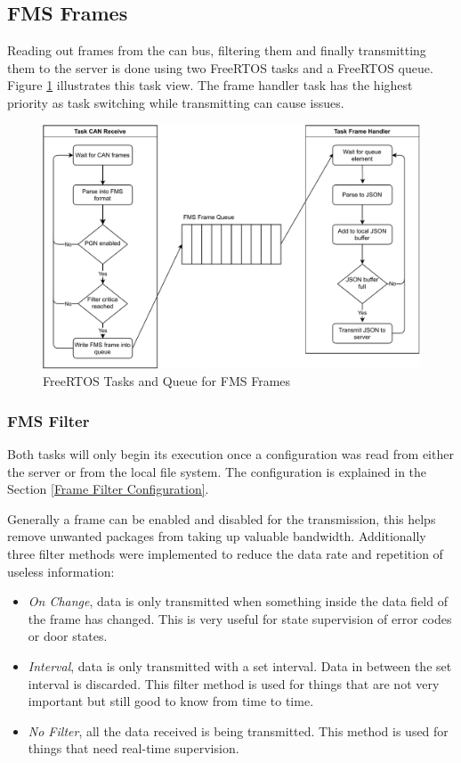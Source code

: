 \newpage
\subsection{FMS Frames} \label{FMS Frame Handler}
Reading out frames from the \acrshort{can} bus, filtering them and finally transmitting them to the server is done using two FreeRTOS tasks and a FreeRTOS queue. Figure \ref{fig:fms-software} illustrates this task view. The frame handler task has the highest priority as task switching while transmitting can cause issues.
\begin{figure}[h!]
	\centering
	\includegraphics[width=\textwidth]{images/fms-software}
	\caption{FreeRTOS Tasks and Queue for FMS Frames}
	\label{fig:fms-software}
\end{figure}

\subsubsection{FMS Filter}
Both tasks will only begin its execution once a configuration was read from either the server or from the local file system. The configuration is explained in the Section \ref{Frame Filter Configuration}.

Generally a frame can be enabled and disabled for the transmission, this helps remove unwanted packages from taking up valuable bandwidth. Additionally three filter methods were implemented to reduce the data rate and repetition of useless information:
\begin{itemize}
		\item \textit{On Change}, data is only transmitted when something inside the data field of the frame has changed. This is very useful for state supervision of error codes or door states. 
		\item \textit{Interval}, data is only transmitted with a set interval. Data in between the set interval is discarded. This filter method is used for things that are not very important but still good to know from time to time.
		\item \textit{No Filter}, all the data received is being transmitted. This method is used for things that need real-time supervision.
\end{itemize}

